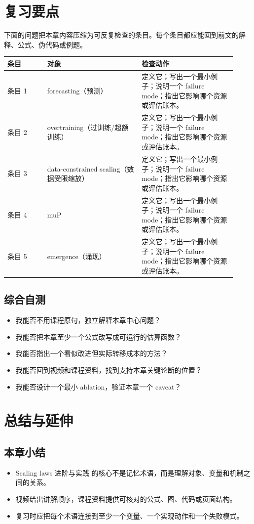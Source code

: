 \documentclass[a4paper]{article}
\begin{document}
\section{复习要点}
下面的问题把本章内容压缩为可反复检查的条目。每个条目都应能回到前文的解释、公式、伪代码或例题。
\begin{longtable}{p{0.16\linewidth}p{0.38\linewidth}p{0.38\linewidth}}
\toprule
\textbf{条目} & \textbf{对象} & \textbf{检查动作}\\
\midrule
条目 1 & forecasting（预测） & 定义它；写出一个最小例子；说明一个 failure mode；指出它影响哪个资源或评估账本。\\
条目 2 & overtraining（过训练/超额训练） & 定义它；写出一个最小例子；说明一个 failure mode；指出它影响哪个资源或评估账本。\\
条目 3 & data-constrained scaling（数据受限缩放） & 定义它；写出一个最小例子；说明一个 failure mode；指出它影响哪个资源或评估账本。\\
条目 4 & muP & 定义它；写出一个最小例子；说明一个 failure mode；指出它影响哪个资源或评估账本。\\
条目 5 & emergence（涌现） & 定义它；写出一个最小例子；说明一个 failure mode；指出它影响哪个资源或评估账本。\\
\bottomrule
\end{longtable}
\subsection{综合自测}
\begin{itemize}
\item 我能否不用课程原句，独立解释本章中心问题？
\item 我能否把本章至少一个公式改写成可运行的估算函数？
\item 我能否指出一个看似改进但实际转移成本的方法？
\item 我能否回到视频和课程资料，找到支持本章关键论断的位置？
\item 我能否设计一个最小 ablation，验证本章一个 caveat？
\end{itemize}
\section{总结与延伸}
\subsection{本章小结}
\begin{itemize}
\item Scaling laws 进阶与实践 的核心不是记忆术语，而是理解对象、变量和机制之间的关系。
\item 视频给出讲解顺序，课程资料提供可核对的公式、图、代码或页面结构。
\item 复习时应把每个术语连接到至少一个变量、一个实现动作和一个失败模式。
\end{itemize}
\end{document}
